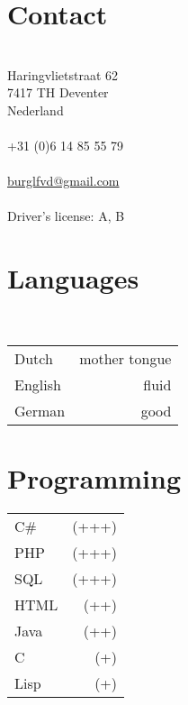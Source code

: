 \documentclass[]{friggeri-cv} %
\begin{document}


\begin{aside} %
\section{Contact}\\
Haringvlietstraat 62\\
7417 TH Deventer\\
Nederland\\
~\\
+31 (0)6 14 85 55 79\\
~\\
\href{mailto:burglfvd@gmail.com}{burglfvd@gmail.com}\\
~\\
Driver's license: A, B\\

\section{Languages}\\
\begin{tabular}{l r}
   Dutch & mother tongue\\
   English & fluid\\
   German & good\\
\end{tabular}

\section{Programming}
\begin{tabular}{l@{\quad} r}
   C\#  & (+++)\\
   PHP & (+++)\\
   SQL & (+++)\\
   HTML & (++)\\
   Java  & (++)\\
   C & (+)\\
   Lisp & (+)\\
\end{tabular}

\end{aside}
\end{document}
